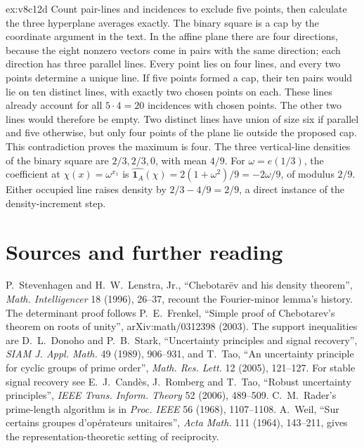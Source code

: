 \begin{solution}{ex:v8c12d}
\idea Count pair-lines and incidences to exclude five points, then calculate the three hyperplane averages exactly.
\writeup The binary square is a cap by the coordinate argument in the text. In the affine plane there are four directions, because the eight nonzero vectors come in pairs with the same direction; each direction has three parallel lines. Every point lies on four lines, and every two points determine a unique line.
If five points formed a cap, their ten pairs would lie on ten distinct lines, with exactly two chosen points on each. These lines already account for all $5\cdot4=20$ incidences with chosen points. The other two lines would therefore be empty. Two distinct lines have union of size six if parallel and five otherwise, but only four points of the plane lie outside the proposed cap. This contradiction proves the maximum is four.
The three vertical-line densities of the binary square are $2/3,2/3,0$, with mean $4/9$. For $\omega=e(1/3)$, the coefficient at $\chi(x)=\omega^{x_1}$ is
$\widehat{\mathbf1_A}(\chi)=2(1+\omega^2)/9=-2\omega/9$,
of modulus $2/9$. Either occupied line raises density by $2/3-4/9=2/9$, a direct instance of the density-increment step.
\end{solution}

\section*{Sources and further reading}

P.~Stevenhagen and H.~W.~Lenstra, Jr., ``Chebotar\"ev and his density theorem'', \emph{Math. Intelligencer} 18 (1996), 26--37, recount the Fourier-minor lemma's history. The determinant proof follows P.~E.~Frenkel, ``Simple proof of Chebotarev's theorem on roots of unity'', arXiv:math/0312398 (2003). The support inequalities are D.~L.~Donoho and P.~B.~Stark, ``Uncertainty principles and signal recovery'', \emph{SIAM J. Appl. Math.} 49 (1989), 906--931, and T.~Tao, ``An uncertainty principle for cyclic groups of prime order'', \emph{Math. Res. Lett.} 12 (2005), 121--127. For stable signal recovery see E.~J.~Cand\`es, J.~Romberg and T.~Tao, ``Robust uncertainty principles'', \emph{IEEE Trans. Inform. Theory} 52 (2006), 489--509. C.~M.~Rader's prime-length algorithm is in \emph{Proc. IEEE} 56 (1968), 1107--1108. A.~Weil, ``Sur certains groupes d'op\'erateurs unitaires'', \emph{Acta Math.} 111 (1964), 143--211, gives the representation-theoretic setting of reciprocity.

